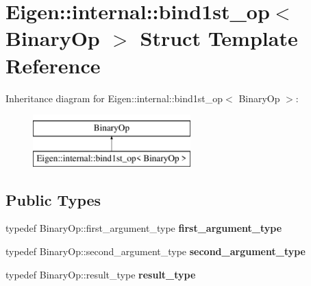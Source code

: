 \hypertarget{struct_eigen_1_1internal_1_1bind1st__op}{}\section{Eigen\+::internal\+::bind1st\+\_\+op$<$ Binary\+Op $>$ Struct Template Reference}
\label{struct_eigen_1_1internal_1_1bind1st__op}
Inheritance diagram for Eigen\+::internal\+::bind1st\+\_\+op$<$ Binary\+Op $>$\+:\begin{figure}[H]
\begin{center}
\leavevmode
\includegraphics[height=2.000000cm]{struct_eigen_1_1internal_1_1bind1st__op}
\end{center}
\end{figure}
\subsection*{Public Types}
\begin{DoxyCompactItemize}
\item 
\mbox{\label{struct_eigen_1_1internal_1_1bind1st__op_a7077959adccaa8d1b40651aa62e52b57}} 
typedef Binary\+Op\+::first\+\_\+argument\+\_\+type {\bfseries first\+\_\+argument\+\_\+type}
\item 
\mbox{\label{struct_eigen_1_1internal_1_1bind1st__op_a02181cf233191b49866496b14645b041}} 
typedef Binary\+Op\+::second\+\_\+argument\+\_\+type {\bfseries second\+\_\+argument\+\_\+type}
\item 
\mbox{\label{struct_eigen_1_1internal_1_1bind1st__op_ac869c115c8c893e8d26b701e737de71d}} 
typedef Binary\+Op\+::result\+\_\+type {\bfseries result\+\_\+type}
\end{DoxyCompactItemize}
